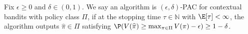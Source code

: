 \documentclass{article}
\newcommand{\mc}[1]{\mathcal{#1}}
\newcommand{\1}{\mathbf{1}}
\renewcommand{\v}{r} %
\begin{document}

\begin{definition}
Fix $\epsilon \geq 0$ and $\delta \in (0,1)$.
We say an algorithm is $(\epsilon,\delta)$-PAC for contextual bandits with policy class $\Pi$, if at the stopping time $\tau \in \mathbb{N}$ with $\E[\tau] < \infty$, the algorithm outputs $\widehat{\pi} \in \Pi$ satisfying $\P( V(\widehat{\pi}) \geq \max_{\pi \in \Pi} V(\pi) - \epsilon ) \geq 1-\delta$.  
\end{definition}


\end{document}
